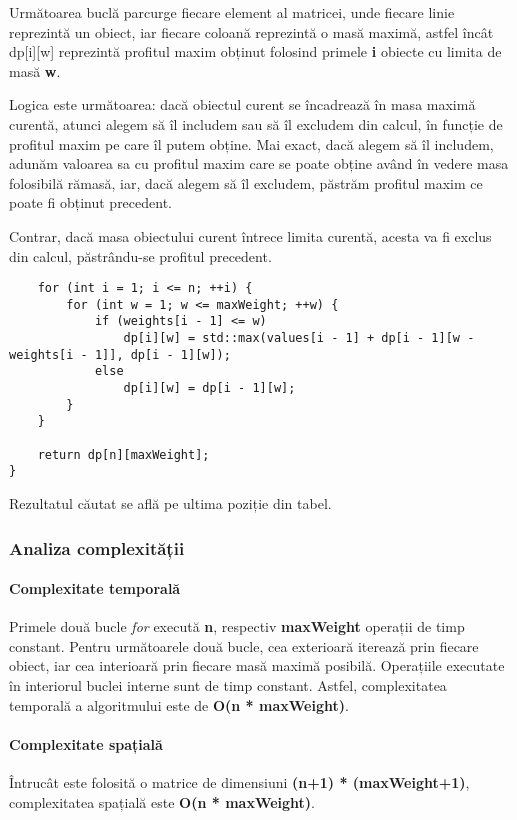 \documentclass[runningheads]{llncs}
\begin{document}
Următoarea buclă parcurge fiecare element al matricei, unde fiecare linie
reprezintă un obiect, iar fiecare coloană reprezintă o masă maximă, astfel
încât dp[i][w] reprezintă profitul maxim obținut folosind primele \textbf{i}
obiecte cu limita de masă \textbf{w}.

Logica este următoarea: dacă obiectul curent
se încadrează în masa maximă curentă, atunci alegem să îl includem sau să îl
excludem din calcul, în funcție de profitul maxim pe care îl putem obține. Mai exact,
dacă alegem să îl includem, adunăm valoarea sa cu profitul maxim care se poate obține
având în vedere masa folosibilă rămasă, iar, dacă alegem să îl excludem, păstrăm profitul
maxim ce poate fi obținut precedent.

Contrar, dacă masa obiectului curent întrece limita curentă, acesta va fi exclus din calcul,
păstrându-se profitul precedent.

\begin{lstlisting}
	for (int i = 1; i <= n; ++i) {
		for (int w = 1; w <= maxWeight; ++w) {
			if (weights[i - 1] <= w)
				dp[i][w] = std::max(values[i - 1] + dp[i - 1][w - weights[i - 1]], dp[i - 1][w]);
			else
				dp[i][w] = dp[i - 1][w];
		}
	}

	return dp[n][maxWeight];
}
\end{lstlisting}

Rezultatul căutat se află pe ultima poziție din tabel.

\subsubsection{Analiza complexității}

\paragraph{Complexitate temporală} Primele două bucle \textit{for} execută \textbf{n},
respectiv \textbf{maxWeight} operații de timp constant. Pentru următoarele două bucle,
cea exterioară iterează prin fiecare obiect, iar cea interioară prin fiecare masă maximă
posibilă. Operațiile executate în interiorul buclei interne sunt de timp constant. Astfel,
complexitatea temporală a algoritmului este de \textbf{O(n * maxWeight)}.

\paragraph{Complexitate spațială} Întrucât este folosită o matrice de dimensiuni \textbf{(n+1) * (maxWeight+1)},
complexitatea spațială este \textbf{O(n * maxWeight)}.
\end{document}
